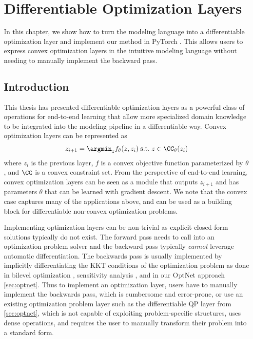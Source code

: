 \graphicspath{{cvxpyth/}}

\chapter{Differentiable \cvxpy Optimization Layers}
\label{sec:cvxpyth}

In this chapter, we show how to turn the \cvxpy
modeling language \citep{diamond2016cvxpy} into
a differentiable optimization layer and
implement our method in PyTorch \citep{paszke2017automatic}.
This allows users to express convex optimization layers in
the intuitive \cvxpy modeling language without needing
to manually implement the backward pass.

\section{Introduction}
This thesis has presented differentiable optimization layers
as a powerful class of operations for end-to-end learning
that allow more specialized domain knowledge to be integrated
into the modeling pipeline in a differentiable way.
Convex optimization layers can be represented as
\begin{equation}
  \label{eq:optimization-layer}
  z_{i+1} = \argmin_z f_\theta(z, z_i)\;
  {\rm s.t.}\;z\in \CC_\theta(z_i)
\end{equation}
where $z_i$ is the previous layer,
$f$ is a convex objective function parameterized
by $\theta$, and $\CC$ is a convex constraint set.
From the perspective of end-to-end learning,
convex optimization layers can be seen
as a module that outputs $z_{i+1}$ and has parameters
$\theta$ that can be learned with gradient descent.
We note that the convex case captures many
of the applications above, and can be used as
a building block for differentiable non-convex
optimization problems.

Implementing optimization layers can be non-trivial as explicit
closed-form solutions typically do not exist.
The forward pass needs to call into an optimization
problem solver and the backward pass typically
\emph{cannot} leverage automatic differentiation.
The backwards pass is usually implemented by implicitly
differentiating the KKT conditions of the optimization problem
as done in bilevel optimization
\citep{gould2016differentiating,kunisch2013bilevel},
sensitivity analysis
\citep{bertsekas1999nonlinear,fiacco1990sensitivity,bonnans2013perturbation},
and in our OptNet approach \cref{sec:optnet}.
Thus to implement an optimization layer, users
have to manually implement the backwards pass,
which is cumbersome and error-prone,
or use an existing optimization problem layer such as
the differentiable QP layer from \cref{sec:optnet},
which is not capable of exploiting problem-specific
structures, uses dense operations, and requires
the user to manually transform their problem into
a standard form.

